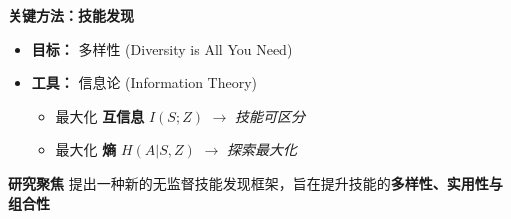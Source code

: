 \documentclass{beamer}
\begin{document}
\begin{frame}
\begin{columns}[T]
\begin{column}{0.5\textwidth}
            \textbf{关键方法：技能发现}
                \begin{itemize}
                    \item \textbf{目标：} 多样性 (Diversity is All You Need)
                    \item \textbf{工具：} 信息论 (Information Theory)
                    \begin{itemize}
                        \tiny
                        \item 最大化 \textbf{互信息} $I(S; Z)$ $\rightarrow$ \textit{技能可区分}
                        \item 最大化 \textbf{熵} $H(A|S, Z)$ $\rightarrow$ \textit{探索最大化}
                    \end{itemize}
                \end{itemize}
            
            \textbf{研究聚焦}
                提出一种新的无监督技能发现框架，旨在提升技能的\textbf{多样性、实用性与组合性}

         \end{column}
    \end{columns}

\end{frame}
\end{document}
